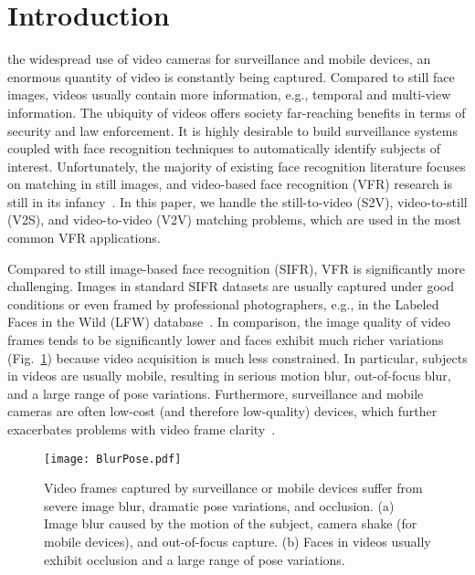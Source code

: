 \documentclass[10pt,journal,cspaper,compsoc]{IEEEtran}
\begin{document}
\maketitle







\section{Introduction}
\label{Sec:Introduction}




 the widespread use of video cameras for surveillance and mobile devices, an enormous quantity of video is constantly being captured.
Compared to still face images, videos usually contain more information, e.g., temporal and multi-view information.
The ubiquity of videos offers society far-reaching benefits in terms of security and law enforcement.
It is highly desirable to build surveillance systems coupled with face recognition techniques to automatically identify subjects of interest.
Unfortunately, the majority of existing face recognition literature focuses on matching in still images,
and video-based face recognition (VFR) research is still in its infancy~\cite{Huang2015Benchmark,best2013video}.
In this paper, we handle the still-to-video (S2V), video-to-still (V2S), and video-to-video (V2V) matching problems,
which are used in the most common VFR applications.

Compared to still image-based face recognition (SIFR), VFR is significantly more challenging.
Images in standard SIFR datasets are usually captured under good conditions or even framed by professional photographers, e.g., in the Labeled Faces in the Wild (LFW) database~\cite{LFWTech}.
In comparison, the image quality of video frames tends to be significantly lower and faces exhibit much richer variations (Fig.~\ref{fig:BlurPose})
because video acquisition is much less constrained.
In particular, subjects in videos are usually mobile, resulting in serious motion blur, out-of-focus blur, and a large range of pose variations.
Furthermore, surveillance and mobile cameras are often low-cost (and therefore low-quality) devices, which further exacerbates problems with video frame clarity~\cite{biswas2013pose}.

\begin{figure}
\centering
\texttt{[image: BlurPose.pdf]}
\caption{Video frames captured by surveillance or mobile devices suffer from severe image blur, dramatic pose variations, and occlusion.
(a) Image blur caused by the motion of the subject, camera shake (for mobile devices), and out-of-focus capture.
(b) Faces in videos usually exhibit occlusion and a large range of pose variations.
}
\label{fig:BlurPose}
\end{figure}
\end{document}
